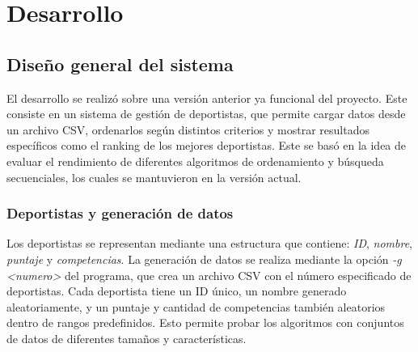 \chapter{Desarrollo}

\section{Diseño general del sistema}

El desarrollo se realizó sobre una versión anterior ya funcional del proyecto. Este consiste en un sistema de gestión de deportistas, que permite cargar datos desde un archivo CSV, ordenarlos según distintos criterios y mostrar resultados específicos como el ranking de los mejores deportistas. Este se basó en la idea de evaluar el rendimiento de diferentes algoritmos de ordenamiento y búsqueda secuenciales, los cuales se mantuvieron en la versión actual.

\subsection{Deportistas y generación de datos}
Los deportistas se representan mediante una estructura que contiene: \textit{ID}, \textit{nombre}, \textit{puntaje} y \textit{competencias}. La generación de datos se realiza mediante la opción \textit{-g <numero>} del programa, que crea un archivo CSV con el número especificado de deportistas. Cada deportista tiene un ID único, un nombre generado aleatoriamente, y un puntaje y cantidad de competencias también aleatorios dentro de rangos predefinidos. Esto permite probar los algoritmos con conjuntos de datos de diferentes tamaños y características.


